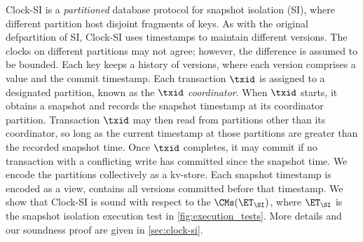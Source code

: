 Clock-SI is a \emph{partitioned} database protocol for snapshot isolation (SI),
where different partition host disjoint fragments of keys.
As with the original defpartition of SI, Clock-SI uses timestamps to maintain different versions. 
The clocks on different partitions may not agree; however, the difference is assumed to be bounded.
Each key keeps a history of versions, where each version comprises a value and the commit timestamp.
Each transaction $\txid$ is assigned to a designated partition, known as the $\txid$ \emph{coordinator}. 
When $\txid$ starts, it obtains a snapshot and records the snapshot timestamp at its coordinator partition.
Transaction $\txid$ may then read from partitions other than its coordinator, so long as the current timestamp at those partitions are greater than the recorded snapshot time. 
Once $\txid$ completes, it may commit if  no transaction with a conflicting write has committed since the snapshot time.
%
We encode the partitions collectively as a kv-store. 
Each snapshot timestamp is encoded as a view, contains all versions committed before that timestamp.
We show that Clock-SI is sound with respect to the $\CMs(\ET_\SI)$, 
where $\ET_\SI$ is the snapshot isolation execution test in \cref{fig:execution_tests}.
More details and our soundness proof are given in \cref{sec:clock-si}.
